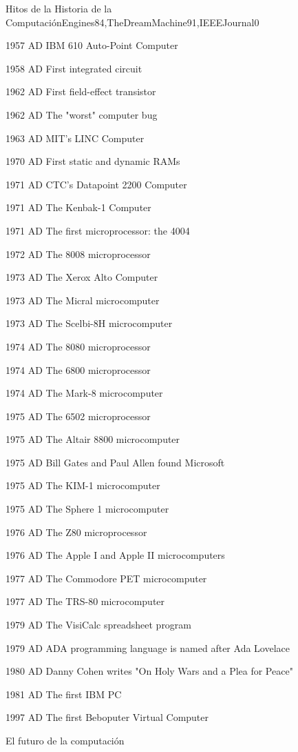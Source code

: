 \begin{syllabus}
\begin{unit}{Hitos de la Historia de la Computación}{Engines84,TheDreamMachine91,IEEEJournal}{0}
\begin{topics}
	\item 1957 AD IBM 610 Auto-Point Computer
	\item 1958 AD First integrated circuit
	\item 1962 AD First field-effect transistor
	\item 1962 AD The "worst" computer bug
	\item 1963 AD MIT's LINC Computer
	\item 1970 AD First static and dynamic RAMs
	\item 1971 AD CTC's Datapoint 2200 Computer
	\item 1971 AD The Kenbak-1 Computer
	\item 1971 AD The first microprocessor: the 4004
	\item 1972 AD The 8008 microprocessor
	\item 1973 AD The Xerox Alto Computer
	\item 1973 AD The Micral microcomputer
	\item 1973 AD The Scelbi-8H microcomputer
	\item 1974 AD The 8080 microprocessor
	\item 1974 AD The 6800 microprocessor
	\item 1974 AD The Mark-8 microcomputer
	\item 1975 AD The 6502 microprocessor
	\item 1975 AD The Altair 8800 microcomputer
	\item 1975 AD Bill Gates and Paul Allen found Microsoft
	\item 1975 AD The KIM-1 microcomputer
	\item 1975 AD The Sphere 1 microcomputer
	\item 1976 AD The Z80 microprocessor
	\item 1976 AD The Apple I and Apple II microcomputers
	\item 1977 AD The Commodore PET microcomputer
	\item 1977 AD The TRS-80 microcomputer
	\item 1979 AD The VisiCalc spreadsheet program
	\item 1979 AD ADA programming language is named after Ada Lovelace
	\item 1980 AD Danny Cohen writes "On Holy Wars and a Plea for Peace"
	\item 1981 AD The first IBM PC
	\item 1997 AD The first Beboputer Virtual Computer
	\item El futuro de la computación
   \end{topics}


\end{unit}
\end{syllabus}
